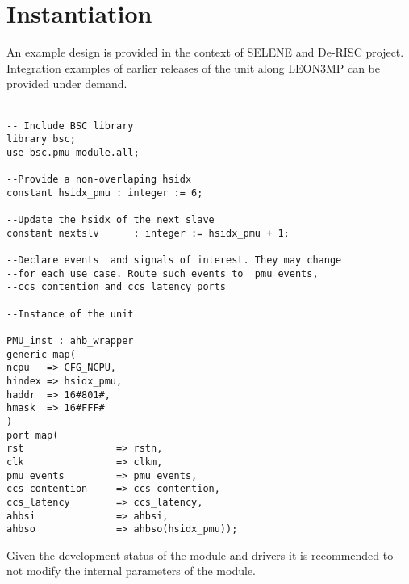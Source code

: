 \section{Instantiation}
An example design is provided in the context of SELENE and De-RISC project. Integration examples of earlier releases of the unit along LEON3MP can be provided under demand.\\
\\
\belowcaptionskip=-10pt
\begin{lstlisting}[label=ins-prot,caption=SafeSU instance example for gpp\_sys,style=vhdl]
-- Include BSC library
library bsc;
use bsc.pmu_module.all;

--Provide a non-overlaping hsidx
constant hsidx_pmu : integer := 6;

--Update the hsidx of the next slave
constant nextslv      : integer := hsidx_pmu + 1;

--Declare events  and signals of interest. They may change 
--for each use case. Route such events to  pmu_events,
--ccs_contention and ccs_latency ports

--Instance of the unit

PMU_inst : ahb_wrapper
generic map(
ncpu   => CFG_NCPU,
hindex => hsidx_pmu,
haddr  => 16#801#,
hmask  => 16#FFF#
)
port map(
rst                => rstn,
clk                => clkm,
pmu_events         => pmu_events,
ccs_contention     => ccs_contention,
ccs_latency        => ccs_latency,
ahbsi              => ahbsi,
ahbso              => ahbso(hsidx_pmu));

\end{lstlisting}
Given the development status of the module and drivers it is recommended to not modify the internal parameters of the module.\\



